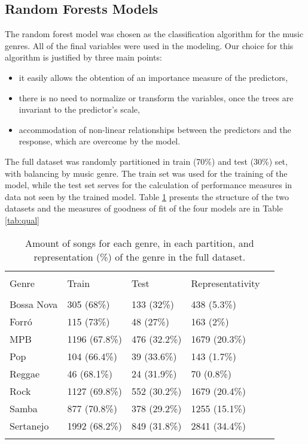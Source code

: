 \documentclass[twocolumn]{article}
\begin{document}
\subsection{Random Forests Models}

The random forest model was chosen as the 
classification algorithm for the music genres. All 
of the final variables were used in the modeling. 
Our choice for this algorithm is justified by three main points:


\begin{itemize}
\item it easily allows the obtention of an 
importance measure of the predictors, 
\item there is no need to normalize or transform the variables, once the trees are invariant to the predictor's scale,
\item accommodation of non-linear relationships between the predictors and the response,
which are overcome by the model. 
\end{itemize}

The full dataset was randomly partitioned in train \thinspace (70\%) and test
\thinspace (30\%) set, with balancing by music
genre. The train set was used for the training of the model, while the test set serves for the calculation
of  performance measures in data not seen by the 
trained model. Table \ref{tab:descrip} presents 
the structure of the two datasets and 
the measures of goodness of fit of the four models
are in Table \ref{tab:qual}

\begin{table}[ht] \centering 
  \caption{Amount of songs for each genre, 
  in each partition, and representation (\%) of the genre in the full dataset.} 
  \label{} 
  \small
  \vspace{3mm}
\begin{tabular}{lllll} 
\\[-1.8ex]\hline 
\hline \\[-1.8ex] 
Genre & \multicolumn{1}{l}{Train} & \multicolumn{1}{l}{Test} &
\multicolumn{1}{l}{Representativity}  \\ 
\hline \\[-1.8ex] 
  Bossa Nova  & 305 (68\%)    &  133 (32\%)   & 438  (5.3\%)\\
  Forró       &  115 (73\%)   &  48  (27\%)   & 163  (2\%) \\
  MPB         & 1196 (67.8\%) & 476  (32.2\%) & 1679 (20.3\%)\\
  Pop         &  104 (66.4\%) &   39 (33.6\%) & 143  (1.7\%)\\
  Reggae      &  46 (68.1\%)  &   24 (31.9\%) & 70   (0.8\%)\\
  Rock        & 1127 (69.8\%) & 552  (30.2\%) & 1679 (20.4\%)\\
  Samba       & 877 (70.8\%)  & 378  (29.2\%) & 1255 (15.1\%)\\
  Sertanejo   & 1992 (68.2\%) & 849  (31.8\%) & 2841 (34.4\%)\\

\hline \hline  \\[-1.8ex] 
\end{tabular} 
\label{tab:descrip}
\end{table} 
\end{document}
